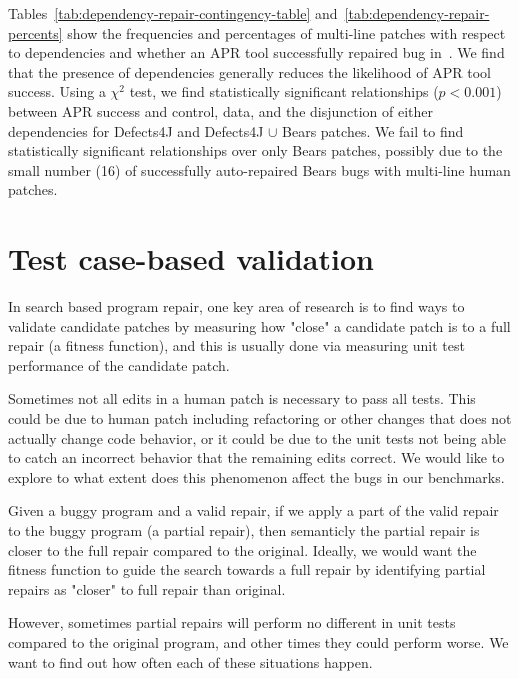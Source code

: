 \documentclass[sigconf, timestamp-false, anonymous=true]{acmart}
\begin{document}
Tables~\ref{tab:dependency-repair-contingency-table} and~\ref{tab:dependency-repair-percents}
show the frequencies and percentages of multi-line patches with respect to dependencies 
and whether an APR tool successfully repaired bug in~\cite{durieux-repair-them-all}.
We find that the presence of dependencies generally reduces the likelihood of APR tool success.
Using a $\chi^2$ test, we find statistically significant relationships ($p < 0.001$)
between APR success and control, data, and the disjunction of either dependencies 
for Defects4J and Defects4J $\cup$ Bears patches. We fail to find statistically 
significant relationships over only Bears patches, possibly due to the small number (16) of 
successfully auto-repaired Bears bugs with multi-line human patches.


\section{Test case-based validation}

In search based program repair, one key area of research is to find ways to validate
candidate patches by
measuring how "close" a candidate patch is to a full repair (a fitness function),
and this is usually done via measuring unit test performance of the candidate patch. 


Sometimes not all edits in a human patch is necessary to pass all tests. This could be
due to human patch including refactoring or other changes that does not actually
change code behavior, or it could be due to the unit tests not being able to catch
an incorrect behavior that the remaining edits correct. We would like to explore
to what extent does this phenomenon affect the bugs in our benchmarks.


Given a buggy program and a valid repair, if we apply a part of the valid repair to 
the buggy program (a partial repair), then semanticly the partial repair is closer
 to the full repair compared to the original. 
Ideally, we would want the fitness function to guide the search towards a full 
repair by identifying partial repairs as "closer" to full repair than original.

However, sometimes partial repairs will perform no different in unit tests compared 
to the original program, and other times they could perform worse. We want to find 
out how often each of these situations happen.
\end{document}
